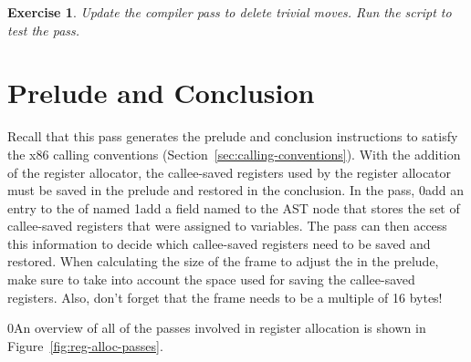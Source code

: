 \documentclass[7x10]{TimesAPriori_MIT}%
\def\racketEd{0}
\def\pythonEd{1}
\def\edition{1}
\newcommand{\racket}[1]{{\if\edition\racketEd{#1}\fi}}
\newcommand{\python}[1]{{\if\edition\pythonEd #1\fi}}
\newtheorem{exercise}[theorem]{Exercise}
\begin{document}
\begin{exercise}\normalfont
%
Update the  compiler pass to delete trivial moves.
%
%
Run the script to test the  pass.
\end{exercise}


\section{Prelude and Conclusion}
\label{sec:print-x86-reg-alloc}

Recall that this pass generates the prelude and conclusion
instructions to satisfy the x86 calling conventions
(Section~\ref{sec:calling-conventions}). With the addition of the
register allocator, the callee-saved registers used by the register
allocator must be saved in the prelude and restored in the conclusion.
In the  pass,
%
\racket{add an entry to the 
  of  named }
%
\python{add a field named \code{used\_callee} to the \code{X86Program} AST node}
%
that stores the set of callee-saved registers that were assigned to
variables. The  pass can then access
this information to decide which callee-saved registers need to be
saved and restored.
%
When calculating the size of the frame to adjust the  in the
prelude, make sure to take into account the space used for saving the
callee-saved registers. Also, don't forget that the frame needs to be
a multiple of 16 bytes!

\racket{An overview of all of the passes involved in register
  allocation is shown in Figure~\ref{fig:reg-alloc-passes}.}
\end{document}
